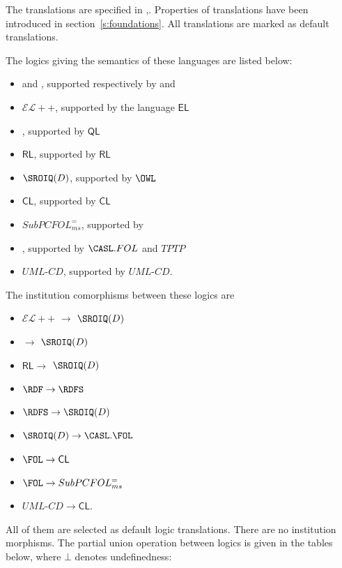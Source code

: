 \documentclass[10pt, a4paper]{isov2}
\makeatletter
\newcommand*\CommentAuthor{}
\renewcommand*\CommentAuthor{#1}}
\newcommand*\CommentDate{}
\renewcommand*\CommentDate{#1}}
\newcommand*\CommentId{}
\renewcommand*\CommentId{#1}}
\newcommand*\CommentType{}
\renewcommand*\CommentType{#1}}
\newcommand*{\SetCommentColorByType}[1]{%
\edef\localType{{#1}}%
\expandafter\ifstrequal\localType{q-aut}{\colorlet{CommentColor}{red}}{%
\expandafter\ifstrequal\localType{q-all}{\colorlet{CommentColor}{orange}}{%
\expandafter\ifstrequal\localType{todo}{\colorlet{CommentColor}{orange}}{%
\expandafter\ifstrequal\localType{fyi}{\colorlet{CommentColor}{lightgray}}{%
\colorlet{CommentColor}{yellow}}}}}}
\newcommand*{\SetCommentPrefixByType}[1]{%
\edef\localType{{#1}}%
\expandafter\@ifmtarg\localType{%
\edef\CommentPrefix{}%
}{%
\caseupper[q]{#1}%
\edef\CommentPrefix{\thestring: }%
}}
\newcommand*{\initComment}[1]{%
\setkeys{Comment}{#1}%
\SetCommentColorByType{\CommentType}%
\relax%
\SetCommentPrefixByType{\CommentType}%
\relax%
}
\newcommand*{\todonote}[2][]{%
\initComment{#1}%
\pdfcomment[author=\CommentAuthor,color=CommentColor,date=\CommentDate,id=\CommentId]{%
\CommentPrefix
#2}}
\renewcommand*{\todonote}[2][]{%
\initComment{#1}%
\ednote{\CommentPrefix #2}}
\newcommand*{\CL}{\ensuremath{\mathsf{CL}}\xspace}
\newcommand{\QL}{\ensuremath{\mathsf{QL}}\xspace}
\newcommand{\RL}{\ensuremath{\mathsf{RL}}\xspace}
\newcommand{\EL}{\ensuremath{\mathsf{EL}}\xspace}
\newcommand{\ELDL}{\ensuremath{\mathcal{EL}}\xspace}
\makeatother
\begin{document}
The translations are specified in \cite{OntoGraph},\cite{MossakowskiEtAl14b}.
Properties of translations have been introduced in section~\ref{s:foundations}.
All translations are marked as default translations. 




The logics giving the semantics of these languages are listed below:
\begin{itemize}
 \item \RDF and \RDFS, supported respectively by \RDF and \RDFS
 \item $\ELDL{+}{+}$, supported by the language \EL
 \item \DLLiteR, supported by \QL
 \item \RL, supported by \RL
 \item $\SROIQ(D)$, supported by $\OWL$
 \item \CL, supported by \CL
 \item $SubPCFOL^=_{ms}$, supported by \CASL
 \item \FOL, supported by $\CASL.FOL$ and $TPTP$
 \item $UML\mbox{-}CD$, supported by $UML\mbox{-}CD$.
\end{itemize}

The institution comorphisms between these logics are
\begin{itemize}
  \item $\ELDL{+}{+}$ $\to$ $\SROIQ(D)$ 
  \item \DLLiteR $\to$ $\SROIQ(D)$ 
  \item \RL $\to$ $\SROIQ(D)$ 
  \item $\RDF \to \RDFS$
  \item $\RDFS \to \SROIQ(D)$ 
  \item $\SROIQ(D)  \to \CASL.\FOL$
  \item $\FOL \to \CL$
  \item $\FOL \to SubPCFOL^=_{ms}$
  \item $UML\mbox{-}CD \to \CL$.
\end{itemize}

All of them are selected as default logic translations. There are no institution morphisms. The partial union operation between logics is given in the tables below, where
$\bot$ denotes undefinedness:
\end{document}
